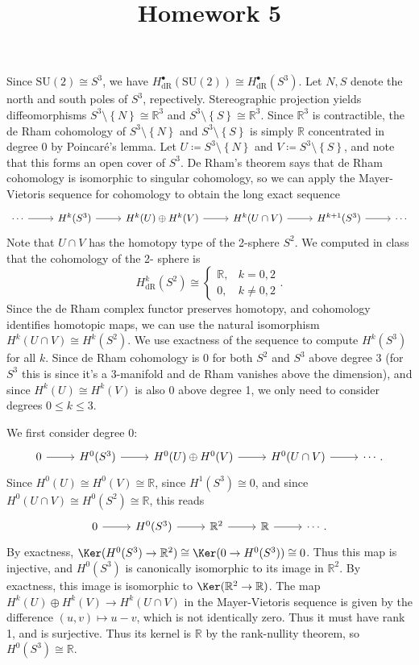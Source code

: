 \documentclass[11pt, letterpaper]{article}
\title{Homework 5}
\theoremstyle{plain}
\begin{document}
\makeproblem

Since $\mathrm{SU} (2)\cong S^3$, we have $H_{\mathrm{dR} }^{\bullet}(\mathrm{SU} (2))\cong H_{\mathrm{dR} }^{\bullet} (S^3)$. Let $N,S$ denote the north and south poles of $S^3$, repectively. Stereographic projection yields diffeomorphisms $S^3\setminus \left\{ N \right\} \cong \mathbb{R} ^3$ and $S^3\setminus \left\{ S \right\} \cong \mathbb{R} ^3$. Since $\mathbb{R} ^3$ is contractible, the de Rham cohomology of $S^3\setminus \left\{ N \right\} $ and $S^3\setminus \left\{ S \right\} $ is simply $\mathbb{R} $ concentrated in degree 0 by Poincar\'e's lemma. Let $U\coloneqq S^3\setminus \left\{ N \right\} $ and $V\coloneqq S^3\setminus \left\{ S \right\} $, and note that this forms an open cover of $S^3$. De Rham's theorem says that de Rham cohomology is isomorphic to singular cohomology, so we can apply the Mayer-Vietoris sequence for cohomology to obtain the long exact sequence
\[\begin{tikzcd}[row sep = 2.5em, column sep = 2.5em]
	\cdots \ar[r] & H^k(S^3)\ar[r]  & H^k(U)\oplus H^k(V)\ar[r]  & H^k(U \cap V)\ar[r]  & H^{k+1} (S^3)\ar[r]  & \cdots
\end{tikzcd}\]
Note that $U \cap V$ has the homotopy type of the 2-sphere $S^2$. We computed in class that the cohomology of the 2- sphere is
\[
	H^k_{\mathrm{dR} } (S^2)\cong 
	\begin{cases}
		\mathbb{R} ,&k=0,2\\
		0,&k\neq 0,2
	\end{cases}
.\]
Since the de Rham complex functor preserves homotopy, and cohomology identifies homotopic maps, we can use the natural isomorphism $H^k(U \cap V) \cong H^k(S^2)$. We use exactness of the sequence to compute $H^k(S^3)$ for all $k$. Since de Rham cohomology is 0 for both $S^2$ and $S^3$ above degree $3$ (for $S^3$ this is since it's a 3-manifold and de Rham vanishes above the dimension), and since $H^k(U)\cong H^k(V)$ is also 0 above degree 1, we only need to consider degrees $0\leq k\leq 3$.


We first consider degree 0:
\[\begin{tikzcd}[row sep = 2.5em, column sep = 2.5em]
	0\ar[r]  & H^0(S^3)\ar[r]  & H^0(U)\oplus H^0(V)\ar[r]  & H^0(U \cap V)\ar[r]   & \cdots .
\end{tikzcd}\]
Since $H^0(U)\cong H^0(V)\cong \mathbb{R} $, since $H^1(S^3)\cong 0$, and since $H^0(U \cap V)\cong H^0(S^2) \cong \mathbb{R} $, this reads
\[\begin{tikzcd}[row sep = 2.5em, column sep = 2.5em]
	0\ar[r]  & H^0(S^3)\ar[r]  & \mathbb{R}^2 \ar[r]  & \mathbb{R} \ar[r]   &\cdots .
\end{tikzcd}\]
By exactness, $\Ker (H^0(S^3)\to \mathbb{R} ^2)\cong \Ker (0\to H^0(S^3))\cong 0$. Thus this map is injective, and $H^0(S^3)$ is canonically isomorphic to its image in $\mathbb{R} ^2$. By exactness, this image is isomorphic to $\Ker (\mathbb{R}^2\to \mathbb{R} )$. The map $H^k(U)\oplus H^k(V)\to H^k(U \cap V)$ in the Mayer-Vietoris sequence is given by the difference $(u,v)\mapsto u-v$, which is not identically zero. Thus it must have rank 1, and is surjective. Thus its kernel is $\mathbb{R} $ by the rank-nullity theorem, so $H^0(S^3)\cong \mathbb{R} $.
\end{document}
